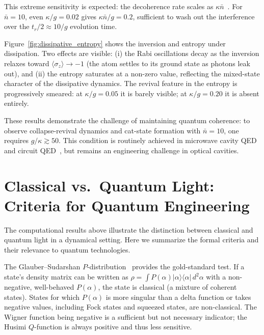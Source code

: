 \documentclass[%
 reprint,
 amsmath,amssymb,
 aps,
]{revtex4-2}
\begin{document}
This extreme sensitivity is expected: the decoherence rate scales as $\kappa\bar{n}$~\cite{zurek2003}. For $\bar{n} = 10$, even $\kappa/g = 0.02$ gives $\kappa\bar{n}/g = 0.2$, sufficient to wash out the interference over the $t_r/2 \approx 10/g$ evolution time.

Figure~\ref{fig:dissipative_entropy} shows the inversion and entropy under dissipation. Two effects are visible: (i) the Rabi oscillations decay as the inversion relaxes toward $\langle\sigma_z\rangle \to -1$ (the atom settles to its ground state as photons leak out), and (ii) the entropy saturates at a non-zero value, reflecting the mixed-state character of the dissipative dynamics. The revival feature in the entropy is progressively smeared: at $\kappa/g = 0.05$ it is barely visible; at $\kappa/g = 0.20$ it is absent entirely.

These results demonstrate the challenge of maintaining quantum coherence: to observe collapse-revival dynamics and cat-state formation with $\bar{n} = 10$, one requires $g/\kappa \gtrsim 50$. This condition is routinely achieved in microwave cavity QED~\cite{haroche2006} and circuit QED~\cite{blais2021}, but remains an engineering challenge in optical cavities.


\section{Classical vs.\ Quantum Light: Criteria for Quantum Engineering}
\label{sec:criteria}

The computational results above illustrate the distinction between classical and quantum light in a dynamical setting. Here we summarize the formal criteria and their relevance to quantum technologies.

The Glauber--Sudarshan $P$-distribution~\cite{glauber1963, sudarshan1963} provides the gold-standard test. If a state's density matrix can be written as $\rho = \int P(\alpha) |\alpha\rangle\langle\alpha|\,d^2\alpha$ with a non-negative, well-behaved $P(\alpha)$, the state is classical (a mixture of coherent states). States for which $P(\alpha)$ is more singular than a delta function or takes negative values, including Fock states and squeezed states, are non-classical. The Wigner function being negative is a sufficient but not necessary indicator; the Husimi $Q$-function is always positive and thus less sensitive.
\end{document}
